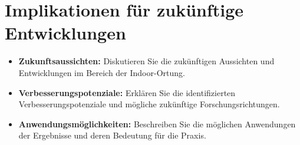 \section{Implikationen für zukünftige Entwicklungen}
\begin{itemize}
    \item \textbf{Zukunftsaussichten:} Diskutieren Sie die zukünftigen Aussichten und Entwicklungen im Bereich der Indoor-Ortung.
    \item \textbf{Verbesserungspotenziale:} Erklären Sie die identifizierten Verbesserungspotenziale und mögliche zukünftige Forschungsrichtungen.
    \item \textbf{Anwendungsmöglichkeiten:} Beschreiben Sie die möglichen Anwendungen der Ergebnisse und deren Bedeutung für die Praxis.
\end{itemize}
